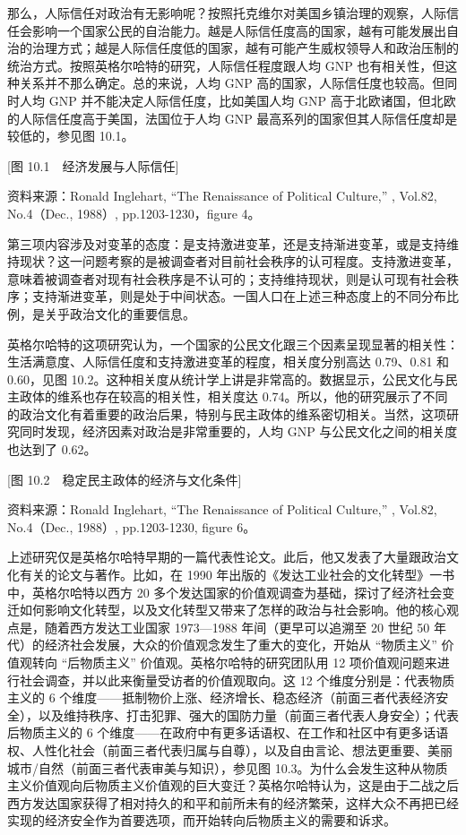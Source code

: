 那么，人际信任对政治有无影响呢？按照托克维尔对美国乡镇治理的观察，人际信任会影响一个国家公民的自治能力。越是人际信任度高的国家，越有可能发展出自治的治理方式；越是人际信任度低的国家，越有可能产生威权领导人和政治压制的统治方式。按照英格尔哈特的研究，人际信任程度跟人均 GNP 也有相关性，但这种关系并不那么确定。总的来说，人均 GNP 高的国家，人际信任度也较高。但同时人均 GNP 并不能决定人际信任度，比如美国人均 GNP 高于北欧诸国，但北欧的人际信任度高于美国，法国位于人均 GNP 最高系列的国家但其人际信任度却是较低的，参见图 10.1。

[图 10.1　经济发展与人际信任]

资料来源：Ronald Inglehart, “The Renaissance of Political Culture,” , Vol.82, No.4（Dec., 1988）, pp.1203-1230，figure 4。

第三项内容涉及对变革的态度：是支持激进变革，还是支持渐进变革，或是支持维持现状？这一问题考察的是被调查者对目前社会秩序的认可程度。支持激进变革，意味着被调查者对现有社会秩序是不认可的；支持维持现状，则是认可现有社会秩序；支持渐进变革，则是处于中间状态。一国人口在上述三种态度上的不同分布比例，是关乎政治文化的重要信息。

英格尔哈特的这项研究认为，一个国家的公民文化跟三个因素呈现显著的相关性：生活满意度、人际信任度和支持激进变革的程度，相关度分别高达 0.79、0.81 和 0.60，见图 10.2。这种相关度从统计学上讲是非常高的。数据显示，公民文化与民主政体的维系也存在较高的相关性，相关度达 0.74。所以，他的研究展示了不同的政治文化有着重要的政治后果，特别与民主政体的维系密切相关。当然，这项研究同时发现，经济因素对政治是非常重要的，人均 GNP 与公民文化之间的相关度也达到了 0.62。

[图 10.2　稳定民主政体的经济与文化条件]

资料来源：Ronald Inglehart, “The Renaissance of Political Culture,” , Vol.82, No.4（Dec., 1988）, pp.1203-1230, figure 6。

上述研究仅是英格尔哈特早期的一篇代表性论文。此后，他又发表了大量跟政治文化有关的论文与著作。比如，在 1990 年出版的《发达工业社会的文化转型》一书中，英格尔哈特以西方 20 多个发达国家的价值观调查为基础，探讨了经济社会变迁如何影响文化转型，以及文化转型又带来了怎样的政治与社会影响。他的核心观点是，随着西方发达工业国家 1973—1988 年间（更早可以追溯至 20 世纪 50 年代）的经济社会发展，大众的价值观念发生了重大的变化，开始从 “物质主义” 价值观转向 “后物质主义” 价值观。英格尔哈特的研究团队用 12 项价值观问题来进行社会调查，并以此来衡量受访者的价值观取向。这 12 个维度分别是：代表物质主义的 6 个维度——抵制物价上涨、经济增长、稳态经济（前面三者代表经济安全），以及维持秩序、打击犯罪、强大的国防力量（前面三者代表人身安全）；代表后物质主义的 6 个维度——在政府中有更多话语权、在工作和社区中有更多话语权、人性化社会（前面三者代表归属与自尊），以及自由言论、想法更重要、美丽城市/自然（前面三者代表审美与知识），参见图 10.3。为什么会发生这种从物质主义价值观向后物质主义价值观的巨大变迁？英格尔哈特认为，这是由于二战之后西方发达国家获得了相对持久的和平和前所未有的经济繁荣，这样大众不再把已经实现的经济安全作为首要选项，而开始转向后物质主义的需要和诉求。

